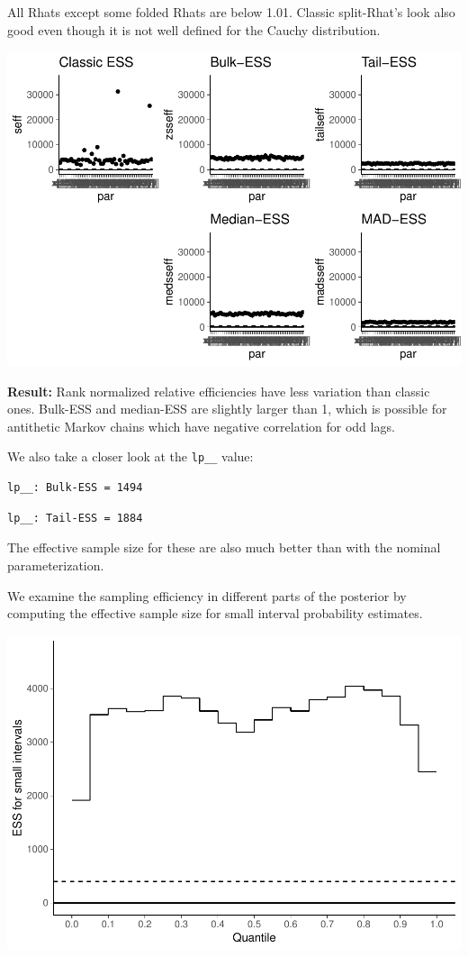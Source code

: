 \documentclass[american,]{article}
\begin{document}
All Rhats except some folded Rhats are below 1.01. Classic split-Rhat's
look also good even though it is not well defined for the Cauchy
distribution.

\includegraphics{graphics/ess-fit-alt3-1.pdf}

\textbf{Result:} Rank normalized relative efficiencies have less
variation than classic ones. Bulk-ESS and median-ESS are slightly larger
than 1, which is possible for antithetic Markov chains which have
negative correlation for odd lags.

We also take a closer look at the \texttt{lp\_\_} value:

\begin{verbatim}
lp__: Bulk-ESS = 1494
\end{verbatim}

\begin{verbatim}
lp__: Tail-ESS = 1884
\end{verbatim}

The effective sample size for these are also much better than with the
nominal parameterization.

We examine the sampling efficiency in different parts of the posterior
by computing the effective sample size for small interval probability
estimates.

\includegraphics{graphics/local-ess-fit-alt3-1.pdf}
\end{document}
